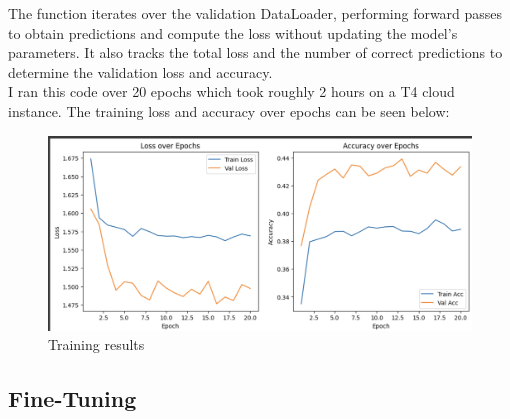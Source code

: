 \documentclass{article}
\begin{document}
The function iterates over the validation DataLoader, performing forward passes to obtain predictions and compute the loss without updating the model's parameters.
It also tracks the total loss and the number of correct predictions to determine the validation loss and accuracy.
\\
I ran this code over 20 epochs which took roughly 2 hours on a T4 cloud instance. The training loss and accuracy over epochs can be seen below:
\begin{figure}[htbp]
    \centering
    \includegraphics[width=\textwidth]{loss_info.png}
    \caption{Training results}
    \label{fig:training_results}
\end{figure}

\subsection*{Fine-Tuning}
\end{document}
